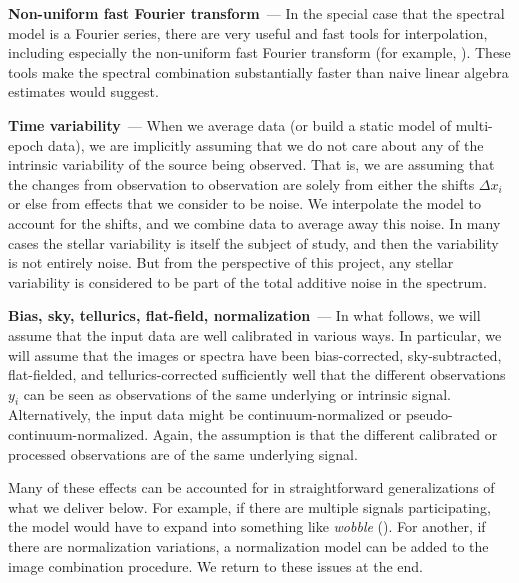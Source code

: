 \documentclass[modern]{aastex631}
\renewcommand{\paragraph}[1]{\medskip\par\noindent\textbf{#1}~---}
\begin{document}
\paragraph{Non-uniform fast Fourier transform}
In the special case that the spectral model is a Fourier series, there are very useful and fast tools for interpolation, including especially the non-uniform fast Fourier transform (for example, \citealt{finufft}).
These tools make the spectral combination substantially faster than naive linear algebra estimates would suggest.

\paragraph{Time variability}
When we average data (or build a static model of multi-epoch data), we are implicitly assuming that we do not care about any of the intrinsic variability of the source being observed.
That is, we are assuming that the changes from observation to observation are solely from either the shifts $\Delta x_i$ or else from effects that we consider to be noise.
We interpolate the model to account for the shifts, and we combine data to average away this noise.
In many cases the stellar variability is itself the subject of study, and then the variability is not entirely noise.
But from the perspective of this project, any stellar variability is considered to be part of the total additive noise in the spectrum.

\paragraph{Bias, sky, tellurics, flat-field, normalization}
In what follows, we will assume that the input data are well calibrated in various ways.
In particular, we will assume that the images or spectra have been bias-corrected, sky-subtracted, flat-fielded, and tellurics-corrected sufficiently well that the different observations $y_i$ can be seen as observations of the same underlying or intrinsic signal.
Alternatively, the input data might be continuum-normalized or pseudo-continuum-normalized.
Again, the assumption is that the different calibrated or processed observations are of the same underlying signal.

Many of these effects can be accounted for in straightforward generalizations of what we deliver below.
For example, if there are multiple signals participating, the model would have to expand into something like \textsl{wobble} (\citealt{wobble}).
For another, if there are normalization variations, a normalization model can be added to the image combination procedure.
We return to these issues at the end. %
\end{document}
